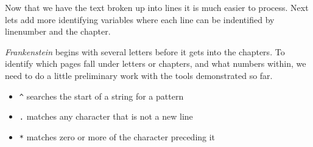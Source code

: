 \documentclass[]{article}
\newenvironment{Shaded}{\begin{snugshade}}{\end{snugshade}}
\newcommand{\DecValTok}[1]{\textcolor[rgb]{0.00,0.00,0.81}{#1}}
\newcommand{\KeywordTok}[1]{\textcolor[rgb]{0.13,0.29,0.53}{\textbf{#1}}}
\newcommand{\NormalTok}[1]{#1}
\newcommand{\OperatorTok}[1]{\textcolor[rgb]{0.81,0.36,0.00}{\textbf{#1}}}
\newcommand{\StringTok}[1]{\textcolor[rgb]{0.31,0.60,0.02}{#1}}
\providecommand{\tightlist}{%
  \setlength{\itemsep}{0pt}\setlength{\parskip}{0pt}}
\begin{document}
Now that we have the text broken up into lines it is much easier to
process. Next lets add more identifying variables where each line can be
indentified by linenumber and the chapter.

\emph{Frankenstein} begins with several letters before it gets into the
chapters. To identify which pages fall under letters or chapters, and
what numbers within, we need to do a little preliminary work with the
tools demonstrated so far.

\begin{Shaded}
\end{Shaded}

\begin{itemize}
\tightlist
\item
  \texttt{\^{}} searches the start of a string for a pattern
\item
  \texttt{.} matches any character that is not a new line
\item
  \texttt{*} matches zero or more of the character preceding it
\end{itemize}
\end{document}
